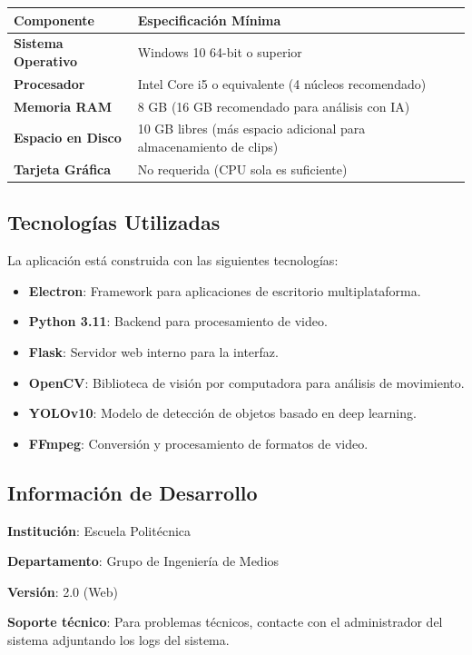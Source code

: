 \documentclass[11pt,a4paper]{article}
\begin{document}
\begin{longtable}{|p{4cm}|p{10cm}|}
\hline
\textbf{Componente} & \textbf{Especificación Mínima} \\ \hline
\endhead

\textbf{Sistema Operativo} & Windows 10 64-bit o superior \\ \hline
\textbf{Procesador} & Intel Core i5 o equivalente (4 núcleos recomendado) \\ \hline
\textbf{Memoria RAM} & 8 GB (16 GB recomendado para análisis con IA) \\ \hline
\textbf{Espacio en Disco} & 10 GB libres (más espacio adicional para almacenamiento de clips) \\ \hline
\textbf{Tarjeta Gráfica} & No requerida (CPU sola es suficiente) \\ \hline
\end{longtable}

\subsection{Tecnologías Utilizadas}

La aplicación está construida con las siguientes tecnologías:

\begin{itemize}
    \item \textbf{Electron}: Framework para aplicaciones de escritorio multiplataforma.
    \item \textbf{Python 3.11}: Backend para procesamiento de video.
    \item \textbf{Flask}: Servidor web interno para la interfaz.
    \item \textbf{OpenCV}: Biblioteca de visión por computadora para análisis de movimiento.
    \item \textbf{YOLOv10}: Modelo de detección de objetos basado en deep learning.
    \item \textbf{FFmpeg}: Conversión y procesamiento de formatos de video.
\end{itemize}

\subsection{Información de Desarrollo}

\textbf{Institución}: Escuela Politécnica

\textbf{Departamento}: Grupo de Ingeniería de Medios

\textbf{Versión}: 2.0 (Web)

\textbf{Soporte técnico}: Para problemas técnicos, contacte con el administrador del sistema adjuntando los logs del sistema.
\end{document}

